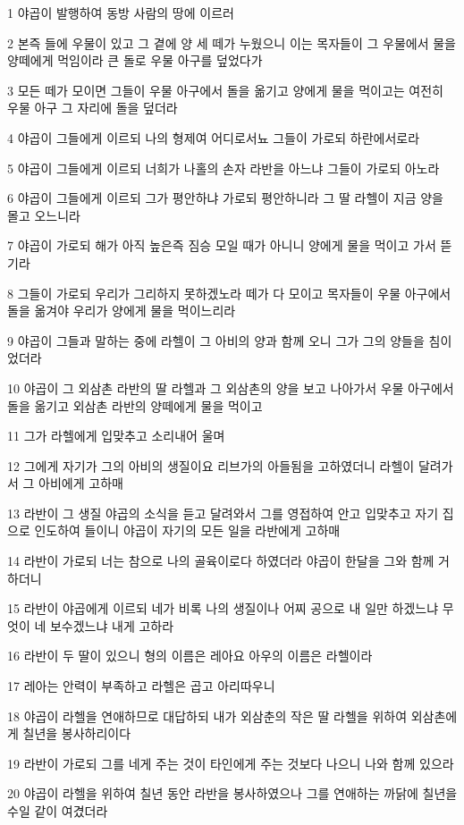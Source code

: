 \par 1 야곱이 발행하여 동방 사람의 땅에 이르러
\par 2 본즉 들에 우물이 있고 그 곁에 양 세 떼가 누웠으니 이는 목자들이 그 우물에서 물을 양떼에게 먹임이라 큰 돌로 우물 아구를 덮었다가
\par 3 모든 떼가 모이면 그들이 우물 아구에서 돌을 옮기고 양에게 물을 먹이고는 여전히 우물 아구 그 자리에 돌을 덮더라
\par 4 야곱이 그들에게 이르되 나의 형제여 어디로서뇨 그들이 가로되 하란에서로라
\par 5 야곱이 그들에게 이르되 너희가 나홀의 손자 라반을 아느냐 그들이 가로되 아노라
\par 6 야곱이 그들에게 이르되 그가 평안하냐 가로되 평안하니라 그 딸 라헬이 지금 양을 몰고 오느니라
\par 7 야곱이 가로되 해가 아직 높은즉 짐승 모일 때가 아니니 양에게 물을 먹이고 가서 뜯기라
\par 8 그들이 가로되 우리가 그리하지 못하겠노라 떼가 다 모이고 목자들이 우물 아구에서 돌을 옮겨야 우리가 양에게 물을 먹이느리라
\par 9 야곱이 그들과 말하는 중에 라헬이 그 아비의 양과 함께 오니 그가 그의 양들을 침이었더라
\par 10 야곱이 그 외삼촌 라반의 딸 라헬과 그 외삼촌의 양을 보고 나아가서 우물 아구에서 돌을 옮기고 외삼촌 라반의 양떼에게 물을 먹이고
\par 11 그가 라헬에게 입맞추고 소리내어 울며
\par 12 그에게 자기가 그의 아비의 생질이요 리브가의 아들됨을 고하였더니 라헬이 달려가서 그 아비에게 고하매
\par 13 라반이 그 생질 야곱의 소식을 듣고 달려와서 그를 영접하여 안고 입맞추고 자기 집으로 인도하여 들이니 야곱이 자기의 모든 일을 라반에게 고하매
\par 14 라반이 가로되 너는 참으로 나의 골육이로다 하였더라 야곱이 한달을 그와 함께 거하더니
\par 15 라반이 야곱에게 이르되 네가 비록 나의 생질이나 어찌 공으로 내 일만 하겠느냐 무엇이 네 보수겠느냐 내게 고하라
\par 16 라반이 두 딸이 있으니 형의 이름은 레아요 아우의 이름은 라헬이라
\par 17 레아는 안력이 부족하고 라헬은 곱고 아리따우니
\par 18 야곱이 라헬을 연애하므로 대답하되 내가 외삼춘의 작은 딸 라헬을 위하여 외삼촌에게 칠년을 봉사하리이다
\par 19 라반이 가로되 그를 네게 주는 것이 타인에게 주는 것보다 나으니 나와 함께 있으라
\par 20 야곱이 라헬을 위하여 칠년 동안 라반을 봉사하였으나 그를 연애하는 까닭에 칠년을 수일 같이 여겼더라
